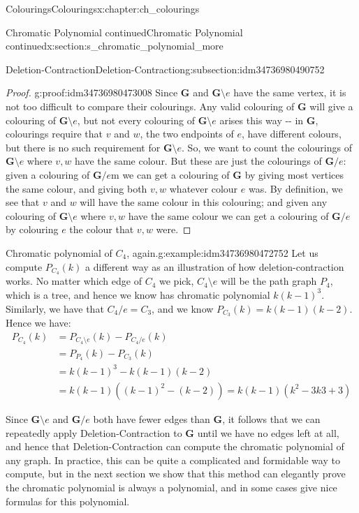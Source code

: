 \documentclass[oneside,10pt,]{book}
\numberwithin{equation}{section}
\newcommand{\bfG}{\mathbf{G}}
\newcommand{\amp}{&}
\begin{document}
\begin{chapterptx}{Colourings}{}{Colourings}{}{}{x:chapter:ch_colourings}
\begin{sectionptx}{Chromatic Polynomial continued}{}{Chromatic Polynomial continued}{}{}{x:section:s_chromatic_polynomial_more}
\begin{subsectionptx}{Deletion-Contraction}{}{Deletion-Contraction}{}{}{g:subsection:idm34736980490752}
\begin{proof}{}{g:proof:idm34736980473008}
Since \(\bfG\) and \(\bfG\setminus e\) have the same vertex, it is not too difficult to compare their colourings.  Any valid colouring of \(\bfG\) will give a colouring of \(\bfG\setminus e\), but not every colouring of \(\bfG\setminus e\) arises this way -{}-{} in \(\bfG\), colourings require that \(v\) and \(w\), the two endpoints of \(e\), have different colours, but there is no such requirement for \(\bfG\setminus e\).  So, we want to count the colourings of \(\bfG\setminus e\) where \(v,w\) have the same colour.  But these are just the colourings of \(\bfG/e\): given a colouring of \(\bfG/e\)m we can get a colouring of \(\bfG\) by giving most vertices the same colour, and giving both \(v,w\) whatever colour \(e\) was.  By definition, we see that \(v\) and \(w\) will have the same colour in this colouring; and given any colouring of \(\bfG\setminus e\) where \(v,w\) have the same colour we can get a colouring of \(\bfG/e\) by colouring \(e\) the colour that \(v,w\) were.%
\end{proof}
\begin{example}{Chromatic polynomial of \(C_4\), again.}{g:example:idm34736980472752}%
Let us compute \(P_{C_4}(k)\) a different way as an illustration of how deletion-contraction works.  No matter which edge of \(C_4\) we pick, \(C_4\setminus e\) will be the path graph \(P_4\), which is a tree, and hence we know has chromatic polynomial \(k(k-1)^3\).  Similarly, we have that \(C_4/e=C_3\), and we know \(P_{C_3}(k)=k(k-1)(k-2)\).  Hence we have:%
%
\begin{align*}
P_{C_4}(k) \amp = P_{C_4\setminus e}(k)-P_{C_4/e}(k) \\
\amp = P_{P_4}(k)-P_{C_3}(k) \\
\amp = k(k-1)^3 - k(k-1)(k-2) \\
\amp = k(k-1)\left( (k-1)^2-(k-2)\right) = k(k-1)(k^2-3k3+3)
\end{align*}
\end{example}
Since \(\bfG\setminus e\) and \(\bfG/e\) both have fewer edges than \(\bfG\), it follows that we can repeatedly apply Deletion-Contraction to \(\bfG\) until we have no edges left at all, and hence that Deletion-Contraction can compute the chromatic polynomial of any graph.  In practice, this can be quite a complicated and formidable way to compute, but in the next section we show that this method can elegantly prove the chromatic polynomial is always a polynomial, and in some cases give nice formulas for this polynomial.%
\end{subsectionptx}
%
%
\typeout{************************************************}

\end{sectionptx}
\end{chapterptx}
\end{document}

